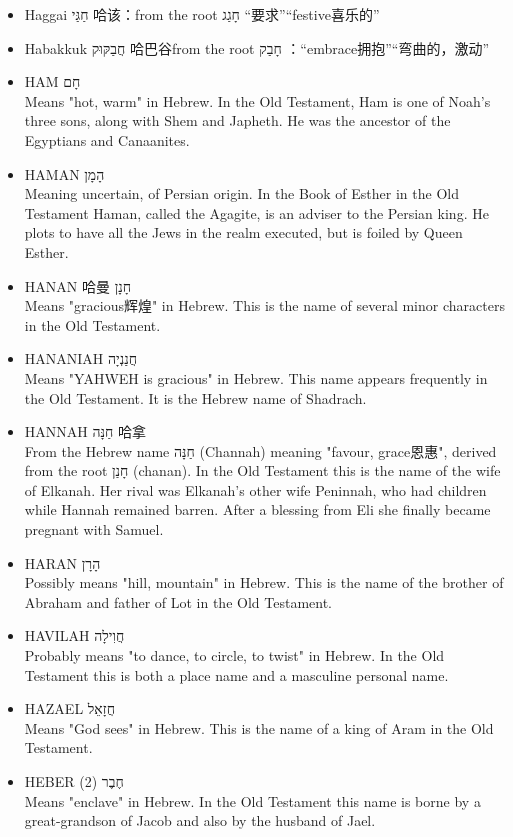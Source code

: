 \begin{itemize} 
\itemsep-.25em  
\item Haggai חַגַּי 哈该：from the root חָגַג “要求”“festive喜乐的”
\item Habakkuk חֲבַקּוּק 哈巴谷from the root חָבַק ：“embrace拥抱”“弯曲的，激动”
\item HAM חָם \\
Means "hot, warm" in Hebrew. In the Old Testament, Ham is one of Noah's three sons, along with Shem and Japheth. He was the ancestor of the Egyptians and Canaanites.
\item HAMAN הָמָן \\
Meaning uncertain, of Persian origin. In the Book of Esther in the Old Testament Haman, called the Agagite, is an adviser to the Persian king. He plots to have all the Jews in the realm executed, but is foiled by Queen Esther.
\item HANAN 哈曼 חָנָן \\
Means "gracious辉煌" in Hebrew. This is the name of several minor characters in the Old Testament.
\item HANANIAH חֲנַנְיָה \\
Means "YAHWEH is gracious" in Hebrew. This name appears frequently in the Old Testament. It is the Hebrew name of Shadrach.
\item HANNAH חַנָּה 哈拿 \\
From the Hebrew name חַנָּה (Channah) meaning "favour, grace恩惠", derived from the root חָנַן (chanan). In the Old Testament this is the name of the wife of Elkanah. Her rival was Elkanah's other wife Peninnah, who had children while Hannah remained barren. After a blessing from Eli she finally became pregnant with Samuel.
\item HARAN הָרָן \\
Possibly means "hill, mountain" in Hebrew. This is the name of the brother of Abraham and father of Lot in the Old Testament.
\item HAVILAH חֲוִילָה \\
Probably means "to dance, to circle, to twist" in Hebrew. In the Old Testament this is both a place name and a masculine personal name.
\item HAZAEL חֲזָאֵל \\
Means "God sees" in Hebrew. This is the name of a king of Aram in the Old Testament.
\item HEBER (2) חֶבֶר \\
Means "enclave" in Hebrew. In the Old Testament this name is borne by a great-grandson of Jacob and also by the husband of Jael.

\end{itemize}
